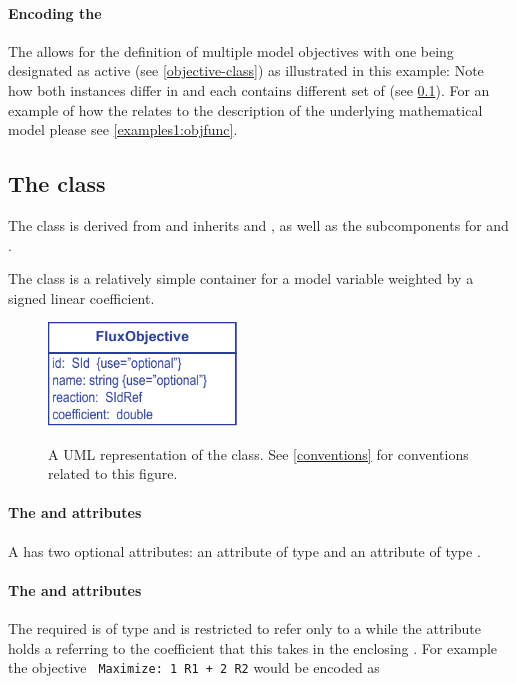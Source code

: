 \pagebreak
\paragraph{Encoding the \Objective}
The \FBCPackage allows for the definition of multiple model objectives with
one being designated as active (see \ref{objective-class}) as illustrated in
this example:
%
%
Note how both \Objective instances differ in  and each contains
different set of  (see \ref{fluxobjective-class}).
For an example of how the \Objective relates to the description of the underlying mathematical model please see \ref{examples1:objfunc}.

\subsection{The \FBC {} class}
\label{fluxobjective-class}

The \FBC \FluxObjective class is derived from \SBML \SBase and inherits
 and , as well as the subcomponents for
\Annotation and \Notes.

The \FluxObjective class is a relatively simple container for a model
variable weighted by a signed linear coefficient.

%
\begin{figure}[h]
  \centering
  \includegraphics[width=5cm]{images/fbc_uml_fobj.pdf}\\
  \caption{A UML representation of the \FBCPackage \FluxObjective class. See
  \ref{conventions} for conventions related to this figure.}
  \label{fig:fbc_uml_fobj}
\end{figure}

\paragraph{The  and  attributes}
A \FluxObjective has two optional attributes:  an attribute of type  and  an attribute of type .

\pagebreak
\paragraph{The  and  attributes}
The required  is of type  and is restricted to refer only to a \Reaction while the  attribute holds a  referring to the coefficient that this \FluxObjective takes in the enclosing \Objective. For example the objective \texttt{ Maximize: 1 R1 + 2 R2} would be encoded as
%


